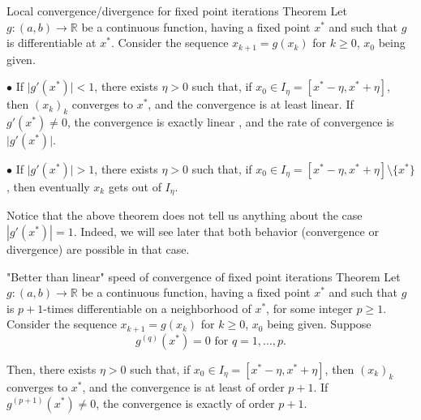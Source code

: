 \documentclass{article}
\begin{document}
        \begin{theorem}{Local convergence/divergence for fixed point iterations Theorem}
            Let $g: (a,b)\to \mathbb{R}$ be a continuous function, having a fixed point $x^*$ and such that $g$ is differentiable at $x^*$. Consider the sequence $x_{k+1}=g(x_k)$ for $k\geq 0$, $x_0$ being given.

            \vspace{6pt}

            $\bullet$ If $\vert g'(x^*) \vert <1$, there exists $\eta >0$ such that, if $x_0 \in I_\eta = [x^*-\eta, x^*+\eta]$, then $(x_k)_k$ converges to $x^*$, and the convergence is at least linear. If $g'(x^*)\neq 0$, the convergence is exactly linear , and the rate of convergence is $\vert g'(x^*) \vert$.

            \vspace{4pt}
            
            $\bullet$ If $\vert g'(x^*) \vert >1$, there exists $\eta >0$ such that, if $x_0 \in I_\eta = [x^*-\eta, x^*+\eta]\setminus \{x^*\}$, then eventually $x_k$ gets out of $I_\eta$. 
        \end{theorem}

        \vspace{10pt}

        \begin{remark}
            Notice that the above theorem does not tell us anything about the case $|g'(x^*)|=1$. Indeed, we will see later that both behavior (convergence or divergence) are possible in that case.
        \end{remark}

        \vspace{10pt}

        \begin{theorem}{"Better than linear" speed of convergence of fixed point iterations Theorem}
            Let $g: (a,b)\to \mathbb{R}$ be a continuous function, having a fixed point $x^*$ and such that $g$ is $p+1$-times differentiable on a neighborhood of $x^*$, for some integer $p\geq 1$. Consider the sequence $x_{k+1}=g(x_k)$ for $k\geq 0$, $x_0$ being given. Suppose 
             $$g^{(q)}(x^*)=0 \text{ for } q=1,\ldots,p.$$

            Then, there exists $\eta >0$ such that, if $x_0 \in I_\eta = [x^*-\eta, x^*+\eta]$, then $(x_k)_k$ converges to $x^*$, and the convergence is at least of order $p+1$. If $g^{(p+1)}(x^*)\neq 0$, the convergence is exactly of order $p+1$.
        \end{theorem}
\end{document}
